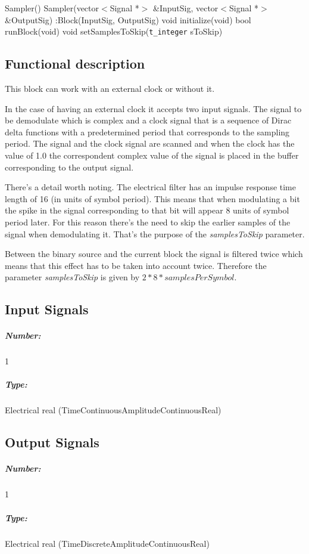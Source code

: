Sampler() {}
\bigbreak
Sampler(vector$<$Signal *$>$ \&InputSig, vector$<$Signal *$>$ \&OutputSig) :Block(InputSig, OutputSig) {}
\bigbreak
void initialize(void)
\bigbreak
bool runBlock(void)
\bigbreak
void setSamplesToSkip(\texttt{t\_integer} sToSkip)

\subsection*{Functional description}

This block can work with an external clock or without it.

In the case of having an external clock it accepts two input signals. The signal to be demodulate which is complex and a clock signal that is a sequence of Dirac delta functions with a predetermined period that corresponds to the sampling period. The signal and the clock signal are scanned and when the clock has the value of 1.0 the correspondent complex value of the signal is placed in the buffer corresponding to the output signal.

There's a detail worth noting. The electrical filter has an impulse response time length of 16 (in units of symbol period). This means that when modulating a bit the spike in the signal corresponding to that bit will appear 8 units of symbol period later. For this reason there's the need to skip the earlier samples of the signal when demodulating it. That's the purpose of the \textit{samplesToSkip} parameter.

Between the binary source and the current block the signal is filtered twice which means that this effect has to be taken into account twice. Therefore the parameter \textit{samplesToSkip} is given by $2*8*samplesPerSymbol$.

\subsection*{Input Signals}

\subparagraph*{Number:} 1

\subparagraph*{Type:} Electrical real (TimeContinuousAmplitudeContinuousReal)

\subsection*{Output Signals}

\subparagraph*{Number:} 1

\subparagraph*{Type:} Electrical real (TimeDiscreteAmplitudeContinuousReal)

